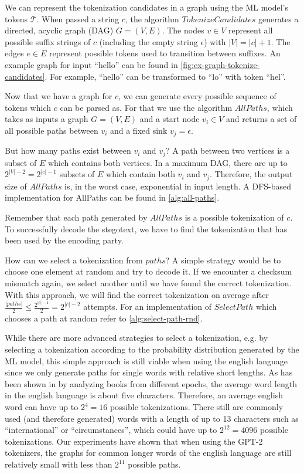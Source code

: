 We can represent the tokenization candidates in a graph using the ML model's tokens $\mathcal{T}$.
When passed a string $c$, the algorithm $TokenizeCandidates$ generates a directed, acyclic graph (DAG) $G = (V, E)$.
The nodes $v \in V$ represent all possible suffix strings of $c$ (including the empty string $\epsilon$) with $|V| = |c| + 1$.
The edges $e \in E$ represent possible tokens used to transition between suffixes.
An example graph for input ``hello'' can be found in \autoref{fig:ex-graph-tokenize-candidates}.
For example, ``hello'' can be transformed to ``lo'' with token ``hel''.

Now that we have a graph for $c$, we can generate every possible sequence of tokens which $c$ can be parsed as.
For that we use the algorithm $AllPaths$, which takes as inputs a graph $G = (V, E)$ and a start node $v_i \in V$ and returns a set of all possible paths between $v_i$ and a fixed sink $v_j = \epsilon$.

But how many paths exist between $v_i$ and $v_j$?
A path between two vertices is a subset of $E$ which contains both vertices.
In a maximum DAG, there are up to $2^{|V|-2} = 2^{|c|-1}$ subsets of $E$ which contain both $v_i$ and $v_j$.
Therefore, the output size of $AllPaths$ is, in the worst case, exponential in input length.
A DFS-based implementation for AllPaths can be found in \autoref{alg:all-paths}.

Remember that each path generated by $AllPaths$ is a possible tokenization of $c$.
To successfully decode the stegotext, we have to find the tokenization that has been used by the encoding party.

How can we select a tokenization from $paths$?
A simple strategy would be to choose one element at random and try to decode it.
If we encounter a checksum mismatch again, we select another until we have found the correct tokenization.
With this approach, we will find the correct tokenization on average after $\frac{|paths|}{2} \leq \frac{2^{|c|-1}}{2} = 2^{|c|-2}$ attempts.
For an implementation of $SelectPath$ which chooses a path at random refer to \autoref{alg:select-path-rnd}.

While there are more advanced strategies to select a tokenization, e.g. by selecting a tokenization according to the probability distribution generated by the ML model, this simple approach is still viable when using the english language since we only generate paths for single words with relative short lengths.
As has been shown in \cite{BoShSo2012} by analyzing books from different epochs, the average word length in the english language is about five characters.
Therefore, an average english word can have up to $2^4 = 16$ possible tokenizations.
There still are commonly used (and therefore generated) words with a length of up to 13 characters such as ``international'' or ``circumstances'', which could have up to $2^{12} = 4096$ possible tokenizations.
Our experiments have shown that when using the GPT-2 tokenizers, the graphs for common longer words of the english language are still relatively small with less than $2^{11}$ possible paths.



